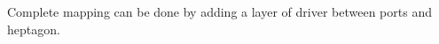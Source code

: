 \documentclass[16pt]{report}
\begin{document}
Complete mapping can be done by adding a layer of driver between ports and heptagon. 











\end{document}
